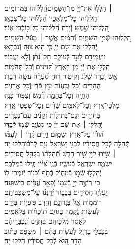 \documentclass[twoside, openany, parskip=half, 11pt]{book}
\begin{document}
\begin{narrow}
 ׀ \hfill \break
הַֽלְל֣וּ אֶת־יְֿיָ֭ מִן־הַשָּׁמַ֑יִם\hfill הַֽ֝לְל֗וּהוּ בַּמְּרוֹמִֽים׃ \\
הַֽלְל֥וּהוּ כׇל־מַלְאָכָ֑יו \hfill הַ֝לְל֗וּהוּ כׇּל־צְבָאָֽו׃ \\
הַֽ֭לְלוּהוּ שֶׁ֣מֶשׁ וְֿיָרֵ֑חַ \hfill הַֽ֝לְל֗וּהוּ כׇּל־כּ֥וֹכְֿבֵי אֽוֹר׃ \\
הַֽ֭לְלוּהוּ שְֿׁמֵ֣י הַשָּׁמָ֑יִם \hfill וְֿ֝הַמַּ֗יִם אֲשֶׁ֤ר ׀ מֵעַ֬ל הַשָּׁמָֽיִם׃ \\
יְֽֿ֭הַלְלוּ אֶת־שֵׁ֣ם יְיָ֑ \hfill כִּ֤י ה֖וּא צִוָּ֣ה וְֿנִבְרָֽאוּ׃ \\
וַיַּעֲמִידֵ֣ם לָעַ֣ד לְֿעוֹלָ֑ם \hfill חׇק־נָ֝תַ֗ן וְֿלֹ֣א יַעֲבֽוֹר׃ \\
הַֽלְל֣וּ אֶת־יְֿיָ֭ מִן־הָאָ֑רֶץ \hfill תַּ֝נִּינִ֗ים וְֿכׇל־תְּהֹמֽוֹת׃ \\
אֵ֣שׁ וּ֭בָרָד שֶׁ֣לֶג וְֿקִיט֑וֹר \hfill ר֥וּחַ סְֿ֝עָרָ֗ה עֹשָׂ֥ה דְֿבָרֽוֹ׃ \\
הֶהָרִ֥ים וְֿכׇל־גְּבָע֑וֹת \hfill עֵ֥ץ פְּֿ֝רִ֗י וְֿכׇל־אֲרָזִֽים׃ \\
הַחַיָּ֥ה וְֿכׇל־בְּהֵמָ֑ה \hfill רֶ֗֝מֶשׂ וְֿצִפּ֥וֹר כָּנָֽף׃ \\
מַלְכֵי־אֶ֭רֶץ וְֿכׇל־לְאֻמִּ֑ים \hfill שָׂ֝רִ֗ים וְֿכׇל־שֹׁ֥פְֿטֵי אָֽרֶץ׃ \\
בַּחוּרִ֥ים וְֿגַם־בְּתוּל֑וֹת \hfill זְֿ֝קֵנִ֗ים עִם־נְעָרִֽים׃ \\
יְֿהַלְל֤וּ ׀ אֶת־שֵׁ֬ם יְיָ֗ \hfill כִּֽי־נִשְׂגָּ֣ב שְֿׁמ֣וֹ לְֿבַדּ֑וֹ\\ ה֝וֹד֗וֹ עַל־אֶ֥רֶץ וְֿשָׁמָֽיִם׃ \hfill
וַיָּ֤רֶם קֶ֨רֶן ׀ לְֿעַמּ֡וֹ\\ תְּֿהִלָּ֤ה לְֽֿכׇל־חֲסִידָ֗יו לִבְנֵ֣י יִ֭שְׂרָאֵל עַ֥ם קְֿרֹב֗וֹ\hfill הַֽלְלוּ־יָֽהּ׃ \\


 ׀ \hfill \break
שִׁ֣ירוּ לַֽייָ֭ שִׁ֣יר חָדָ֑שׁ \hfill תְּֿ֝הִלָּת֗וֹ בִּקְהַ֥ל חֲסִידִֽים׃ \\
יִשְׂמַ֣ח יִשְׂרָאֵ֣ל בְּֿעֹשָׂ֑יו \hfill בְּֿנֵֽי־צִ֝יּ֗וֹן יָגִ֥ילוּ בְֿמַלְכָּֽם׃ \\
יְֿהַלְל֣וּ שְֿׁמ֣וֹ בְֿמָח֑וֹל \hfill בְּֿתֹ֥ף וְֿ֝כִנּ֗וֹר יְֿזַמְּרוּ־לֽוֹ׃ \\
כִּֽי־רוֹצֶ֣ה יְיָ֣ בְּֿעַמּ֑וֹ \hfill יְֿפָאֵ֥ר עֲ֝נָוִ֗ים בִּישׁוּעָֽה׃ \\
יַעְלְז֣וּ חֲסִידִ֣ים בְּֿכָב֑וֹד \hfill יְֿ֝רַנְּנ֗וּ עַל־מִשְׁכְּבוֹתָֽם׃ \\
רוֹמְֿמ֣וֹת אֵ֭ל בִּגְרוֹנָ֑ם \hfill וְֿחֶ֖רֶב פִּיפִיּ֣וֹת בְּֿיָדָֽם׃ \\
לַעֲשׂ֣וֹת נְֿ֭קָמָה בַּגּוֹיִ֑ם \hfill תּ֝וֹכֵח֗וֹת בַּלְאֻמִּֽים׃ \\
לֶאְסֹ֣ר מַלְכֵיהֶ֣ם בְּֿזִקִּ֑ים \hfill וְֿ֝נִכְבְּדֵיהֶ֗ם\\ בְּֿכַבְלֵ֥י בַרְזֶֽל׃ \hfill
לַעֲשׂ֤וֹת בָּהֶ֨ם ׀ מִשְׁפָּ֬ט כָּת֗וּב\\ הָדָ֣ר ה֭וּא לְֿכׇל־חֲסִידָ֗יו \hfill הַֽלְלוּ־יָֽהּ׃ \\



\end{narrow}
\end{document}

